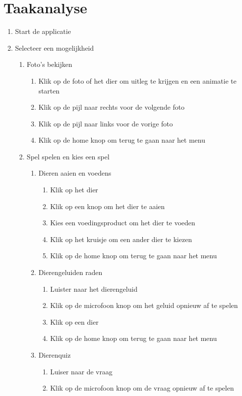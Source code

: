 \documentclass[12pt]{article}
\begin{document}
\section{Taakanalyse}
\begin{enumerate}
	\item Start de applicatie
	\item Selecteer een mogelijkheid
	\begin{enumerate}[(1)]
		\item Foto's bekijken
		\begin{enumerate}[1.]
			\item Klik op de foto of het dier om uitleg te krijgen en een animatie te starten
			\item Klik op de pijl naar rechts voor de volgende foto
			\item Klik op de pijl naar links voor de vorige foto
			\item Klik op de home knop om terug te gaan naar het menu
		\end{enumerate}
		\item Spel spelen en kies een spel
		\begin{enumerate}[1.]
			\item Dieren aaien en voedens
			\begin{enumerate}[(1)]
				\item Klik op het dier
				\item Klik op een knop om het dier te aaien
				\item Kies een voedingsproduct om het dier te voeden
				\item Klik op het kruisje om een ander dier te kiezen
				\item Klik op de home knop om terug te gaan naar het menu
			\end{enumerate}
			\item Dierengeluiden raden
			\begin{enumerate}[(1)]
				\item Luister naar het dierengeluid
				\item Klik op de microfoon knop om het geluid opnieuw af te spelen
				\item Klik op een dier
				\item Klik op de home knop om terug te gaan naar het menu
			\end{enumerate}
			\item Dierenquiz
			\begin{enumerate}[(1)]
				\item Luiser naar de vraag
				\item Klik op de microfoon knop om de vraag opnieuw af te spelen

\end{enumerate}
\end{enumerate}
\end{enumerate}
\end{enumerate}
\end{document}

